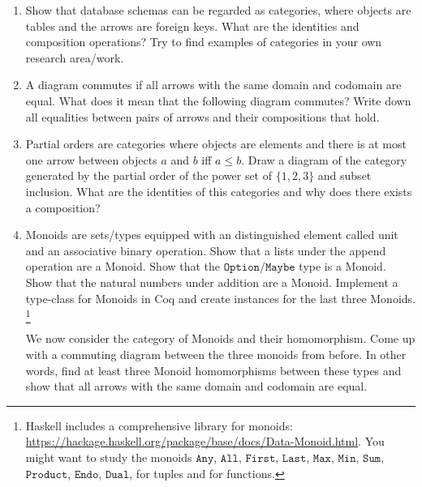 \documentclass{scrartcl}
\begin{document}
\begin{enumerate}

\item
  Show that database schemas can be regarded as categories, where objects are tables and the arrows are foreign keys.
  What are the identities and composition operations?
  Try to find examples of categories in your own research area/work.

\item
  A diagram commutes if all arrows with the same domain and codomain are equal.
  What does it mean that the following diagram commutes?
  Write down all equalities between pairs of arrows and their compositions that hold.
  \begin{center}
  \end{center}

\item
  Partial orders are categories where objects are elements and there is at most one arrow between objects $a$ and $b$ iff $a \leq b$.
  Draw a diagram of the category generated by the partial order of the power set of $\{1,2,3\}$ and subset inclusion.
  What are the identities of this categories and why does there exists a composition?

\item
  Monoids are sets/types equipped with an distinguished element called unit and an associative binary operation.
  Show that a lists under the append operation are a Monoid.
  Show that the $\mathtt{Option}/\mathtt{Maybe}$ type is a Monoid.
  Show that the natural numbers under addition are a Monoid.
  Implement a type-class for Monoids in Coq and create instances for the last three Monoids.
  \footnote{Haskell includes a comprehensive library for monoids:
    \url{https://hackage.haskell.org/package/base/docs/Data-Monoid.html}.
    You might want to study the monoids $\mathtt{Any}$, $\mathtt{All}$, $\mathtt{First}$, $\mathtt{Last}$, $\mathtt{Max}$, $\mathtt{Min}$, $\mathtt{Sum}$, $\mathtt{Product}$,  $\mathtt{Endo}$, $\mathtt{Dual}$, for tuples and for functions.}

  We now consider the category of Monoids and their homomorphism.
  Come up with a commuting diagram between the three monoids from before.
  In other words, find at least three Monoid homomorphisms between these types and show that all arrows with the same domain and codomain are equal.


\end{enumerate}
\end{document}
